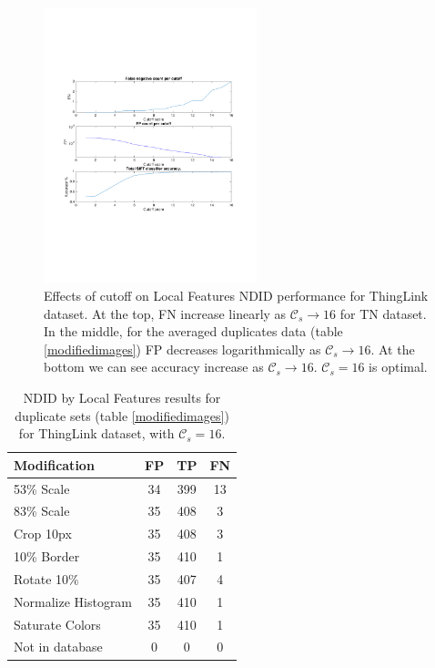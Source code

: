 \documentclass[english,12pt,a4paper,pdftex,elec,utf8, table]{aaltothesis}
\begin{document}
\begin{figure}[htb]
\begin{center}
\includegraphics[height=8cm]{figures/thinglink_SIFTCountROC}
\end{center}
\caption{ Effects of cutoff on Local Features NDID performance for ThingLink dataset. At the top, FN increase linearly as $\mathcal{C}_s \rightarrow 16$ for TN dataset. In the middle, for the averaged duplicates data (table \ref{modifiedimages}) FP decreases logarithmically as $\mathcal{C}_s \rightarrow 16$. At the bottom we can see accuracy increase as $\mathcal{C}_s \rightarrow 16$. $\mathcal{C}_s=16$ is optimal.}
\label{thinglinkfigcutoff}
\end{figure}


\begin{table}
\caption{ NDID by Local Features results for duplicate sets (table \ref{modifiedimages}) for ThingLink dataset, with $\mathcal{C}_s = 16$.}
\label{thinglinksiftresults}
\begin{center}
  \begin{tabular}{@{}lccc@{}}
    \toprule
    Modification & FP & TP & FN\\
    \hline
    53\% Scale & 34 & 399 & 13 \\
    83\% Scale & 35 & 408 & 3 \\
    Crop 10px  & 35 & 408 & 3 \\
    10\% Border & 35 & 410 & 1 \\
    Rotate 10\% & 35 & 407 & 4\\
    Normalize Histogram & 35 & 410 & 1\\
    Saturate Colors & 35 & 410 & 1\\
    Not in database & 0 & 0 & 0\\
    \bottomrule
\end{tabular}
\end{center}
\end{table}
\end{document}
